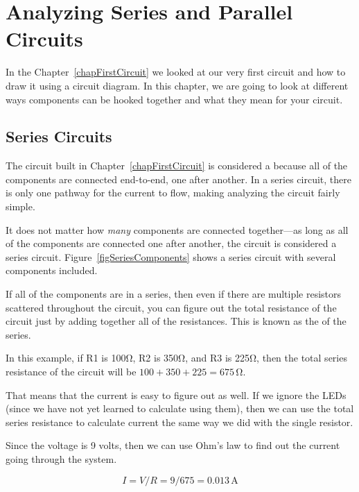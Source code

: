 \chapter{Analyzing Series and Parallel Circuits}

In the Chapter~\ref{chapFirstCircuit} we looked at our very first circuit and how to draw it using a circuit diagram.
In this chapter, we are going to look at different ways components can be hooked together and what they mean for your circuit.

\section{Series Circuits}

The circuit built in Chapter~\ref{chapFirstCircuit} is considered a  because all of the components are connected end-to-end, one after another.
In a series circuit, there is only one pathway for the current to flow, making analyzing the circuit fairly simple.

It does not matter how \emph{many} components are connected together---as long as all of the components are connected one after another, the circuit is considered a series circuit.
Figure~\ref{figSeriesComponents} shows a series circuit with several components included.


If all of the components are in a series, then even if there are multiple resistors scattered throughout the circuit, you can figure out the total resistance of the circuit just by adding together all of the resistances.
This is known as the  of the series.

In this example, if R1 is 100\si{\ohm}, R2 is 350\si{\ohm}, and R3 is 225\si{\ohm}, then the total series resistance of the circuit will be $100 + 350 + 225 = 675\,\si{\ohm}$.

That means that the current is easy to figure out as well.
If we ignore the LEDs (since we have not yet learned to calculate using them), then we can use the total series resistance to calculate current the same way we did with the single resistor.

Since the voltage is 9 volts, then we can use Ohm's law to find out the current going through the system.

$$I = V / R = 9 / 675 = 0.013\,\si{\ampere}$$

